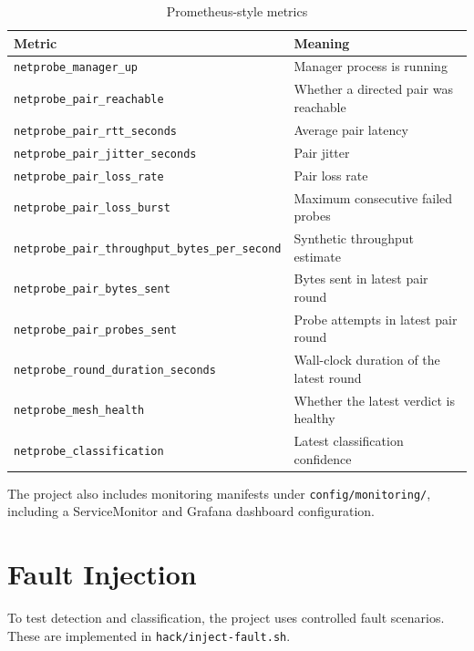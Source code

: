 \documentclass[11pt,a4paper]{article}
\newcommand{\code}[1]{\texttt{#1}}
\begin{document}
\begin{table}[h]
\centering
\caption{Prometheus-style metrics}
\label{tab:metrics}
\begin{tabularx}{\textwidth}{@{}lY@{}}
\toprule
\textbf{Metric} & \textbf{Meaning} \\
\midrule
\code{netprobe\_manager\_up} & Manager process is running \\
\code{netprobe\_pair\_reachable} & Whether a directed pair was reachable \\
\code{netprobe\_pair\_rtt\_seconds} & Average pair latency \\
\code{netprobe\_pair\_jitter\_seconds} & Pair jitter \\
\code{netprobe\_pair\_loss\_rate} & Pair loss rate \\
\code{netprobe\_pair\_loss\_burst} & Maximum consecutive failed probes \\
\code{netprobe\_pair\_throughput\_bytes\_per\_second} & Synthetic throughput estimate \\
\code{netprobe\_pair\_bytes\_sent} & Bytes sent in latest pair round \\
\code{netprobe\_pair\_probes\_sent} & Probe attempts in latest pair round \\
\code{netprobe\_round\_duration\_seconds} & Wall-clock duration of the latest round \\
\code{netprobe\_mesh\_health} & Whether the latest verdict is healthy \\
\code{netprobe\_classification} & Latest classification confidence \\
\bottomrule
\end{tabularx}
\end{table}

The project also includes monitoring manifests under \code{config/monitoring/}, including a ServiceMonitor and Grafana dashboard configuration.

\section{Fault Injection}

To test detection and classification, the project uses controlled fault scenarios. These are implemented in \code{hack/inject-fault.sh}.
\end{document}

